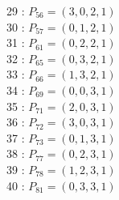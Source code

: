 \documentclass{article}
\begin{document}
{\begin{multicols}{3}
29 : $P_{56}=( 3, 0, 2, 1 )$\\
30 : $P_{57}=( 0, 1, 2, 1 )$\\
31 : $P_{61}=( 0, 2, 2, 1 )$\\
32 : $P_{65}=( 0, 3, 2, 1 )$\\
33 : $P_{66}=( 1, 3, 2, 1 )$\\
34 : $P_{69}=( 0, 0, 3, 1 )$\\
35 : $P_{71}=( 2, 0, 3, 1 )$\\
36 : $P_{72}=( 3, 0, 3, 1 )$\\
37 : $P_{73}=( 0, 1, 3, 1 )$\\
38 : $P_{77}=( 0, 2, 3, 1 )$\\
39 : $P_{78}=( 1, 2, 3, 1 )$\\
40 : $P_{81}=( 0, 3, 3, 1 )$\\
\end{multicols}


%


%


}%
\end{document}
